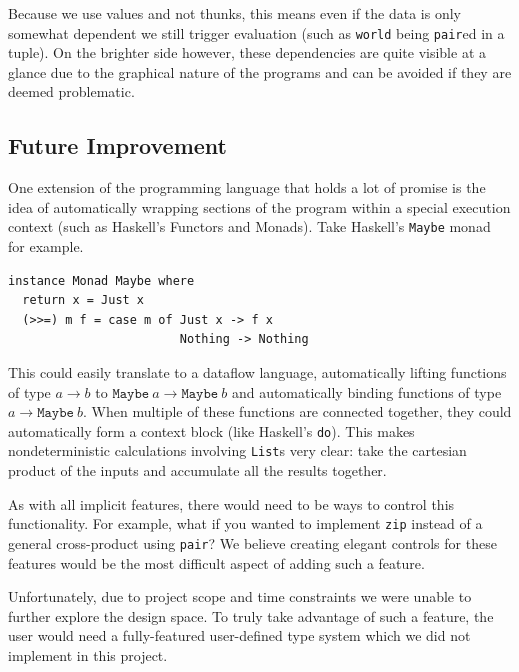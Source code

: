 \documentclass[12pt,UTF8,a4]{article}
\newcommand{\code}[1]{\texttt{#1}}
\newcommand{\type}[1]{\texttt{#1}}
\begin{document}
Because we use values and not thunks, this means even if the data is
only somewhat dependent we still trigger evaluation (such as
\type{world} being \code{pair}ed in a tuple). On the brighter side
however, these dependencies are quite visible at a glance due to the
graphical nature of the programs and can be avoided if they are deemed
problematic.

\subsection{Future Improvement}
One extension of the programming language that holds a lot of promise
is the idea of automatically wrapping sections of the program within a
special execution context (such as Haskell's Functors and
Monads). Take Haskell's \code{Maybe} monad for example.
\begin{center}
\begin{verbatim}
instance Monad Maybe where
  return x = Just x
  (>>=) m f = case m of Just x -> f x
                        Nothing -> Nothing
\end{verbatim}
\end{center}

This could easily translate to a dataflow language, automatically
lifting functions of type $a \rightarrow b$ to $\type{Maybe}\ a
\rightarrow \type{Maybe}\ b$ and automatically binding functions of
type $a \rightarrow \type{Maybe}\ b$. When multiple of these functions
are connected together, they could automatically form a context block
(like Haskell's \code{do}). This makes nondeterministic calculations
involving \code{List}s very clear: take the cartesian product of the inputs and accumulate all the results together.

As with all implicit features, there would need to be ways to control
this functionality. For example, what if you wanted to implement
\code{zip} instead of a general cross-product using \code{pair}? We
believe creating elegant controls for these features would be the most
difficult aspect of adding such a feature.

Unfortunately, due to project scope and time constraints we were
unable to further explore the design space. To truly take advantage of
such a feature, the user would need a fully-featured user-defined type
system which we did not implement in this project.
\end{document}
